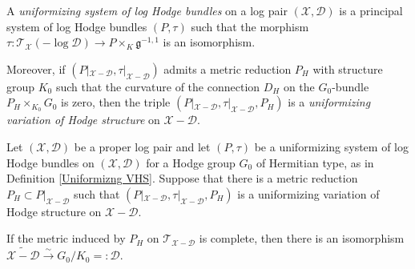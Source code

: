 \documentclass[10pt,a4paper]{amsart}
\begin{document}
\begin{definition}\label{Uniformizng VHS}
A \emph{uniformizing system of log Hodge bundles} on a log pair $(\mathscr{X},\mathscr{D})$ is a principal system of log Hodge bundles $(P,\tau)$ such that the morphism $\tau:\mathcal{T}_{\mathscr{X}}(-\log \mathscr{D})\to P\times_K\mathfrak{g}^{-1,1}$ is an isomorphism. 

Moreover, if $(P|_{\mathscr{X}-\mathscr{D}},\tau|_{\mathscr{X}-\mathscr{D}})$ admits a metric reduction $P_H$ with structure group $K_0$ such that the curvature of the connection $D_H$ on the $G_0$-bundle $P_H\times_{K_0}G_0$ is zero, then the triple $(P|_{\mathscr{X}-\mathscr{D}},\tau|_{\mathscr{X}-\mathscr{D}},P_H)$ is a \emph{uniformizing variation of Hodge structure} on $\mathscr{X}-\mathscr{D}$.
\end{definition}

\begin{lemma}\label{Completeness-lem}
Let $(\mathscr{X},\mathscr{D})$ be a proper log pair and let $(P,\tau)$ be a uniformizing system of log Hodge bundles on $(\mathscr{X},\mathscr{D})$ for a Hodge group $G_0$ of Hermitian type, as in Definition \ref{Uniformizng VHS}. Suppose that there is a metric reduction $P_H\subset P|_{\mathscr{X}-\mathscr{D}}$ such that $(P|_{\mathscr{X}-\mathscr{D}},\tau|_{\mathscr{X}-\mathscr{D}},P_H)$ is a uniformizing variation of Hodge structure on $\mathscr{X}-\mathscr{D}$.

If the metric induced by $P_H$ on $\mathcal{T}_{\mathscr{X}-\mathscr{D}}$ is complete, then there is an isomorphism $\widetilde{\mathscr{X}-\mathscr{D}}\xrightarrow{\sim}G_0/K_0=:\mathcal{D}$.
\end{lemma}
\end{document}
